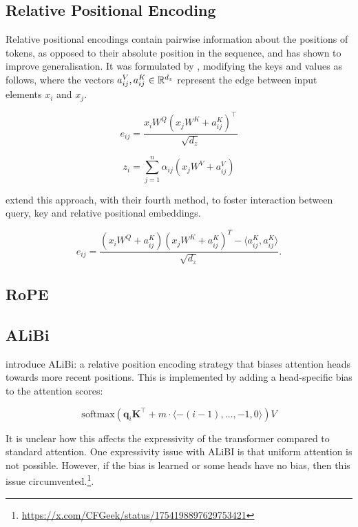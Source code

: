 \subsection{Relative Positional Encoding}

Relative positional encodings contain pairwise information about the positions of tokens, as opposed to their absolute position in the sequence, and has shown to improve generalisation.
It was formulated by \citet{shaw2018self}, modifying the keys and values as follows, where the vectors $a^V_{ij}, a^K_{ij} \in \mathbb{R}^{d_z}$ represent the edge between input elements $x_i$ and $x_j$.

\begin{equation}
    e_{ij} = \frac{x_i W^Q (x_j W^K + a_{ij}^K)^\top}{\sqrt{d_z}}
\end{equation}

\begin{equation}
    z_i = \sum_{j = 1}^n \alpha_{ij} (x_j W^V + a_{ij}^V)
\end{equation}

\citet{huang2020improvetransformermodelsbetter} extend this approach, with their fourth method, to foster interaction between query, key and relative positional embeddings.

\begin{equation}
    e_{ij} = \frac{(x_i W^Q + a_{ij}^K)(x_j W^K + a_{ij}^K)^T - \langle a_{ij}^K, a_{ij}^K\rangle}{\sqrt{d_z}}.
\end{equation}

\subsection{RoPE}


\subsection{ALiBi}

\citet{press2022train} introduce ALiBi: a relative position encoding strategy that biases attention heads towards more recent positions.
This is implemented by adding a head-specific bias to the attention scores:

\begin{equation*}
    \mathrm{softmax}\left( \mathbf q_i \mathbf K^\top + m \cdot \langle -(i-1), \ldots, -1, 0 \rangle \right)V
\end{equation*}

It is unclear how this affects the expressivity of the transformer compared to standard attention.
One expressivity issue with ALiBI is that uniform attention is not possible.
However, if the bias is learned or some heads have no bias, then this issue circumvented.\footnote{\url{https://x.com/CFGeek/status/1754198897629753421}}.

